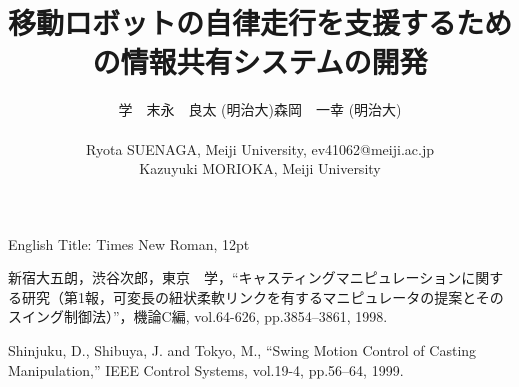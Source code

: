 \documentclass[9pt]{jarticle}
\begin{document}
\makeatletter
\title{移動ロボットの自律走行を支援するための情報共有システムの開発}
{}
{English Title: Times New Roman, 12pt}
{}


\author{
\begin{tabular}{ll}
 \hspace{1zw}学\hspace{1zw}　末永　良太 (明治大)\hspace{1zw}森岡　一幸 (明治大)\\
 &\\
 \multicolumn{2}{l}{\small Ryota SUENAGA, Meiji University, ev41062@meiji.ac.jp}\\
 \multicolumn{2}{l}{\small Kazuyuki MORIOKA, Meiji University}\\
\end{tabular}
}
\makeatother


\date{} %

\maketitle
\thispagestyle{empty}
\pagestyle{empty}

\small

\begin{spacing}{1.2}




\end{spacing}

\footnotesize
\begin{thebibliography}{99}

新宿大五朗，渋谷次郎，東京　学，``キャスティングマニピュレーションに関する研究（第1報，可変長の紐状柔軟リンクを有するマニピュレータの提案とそのスイング制御法）''，機論C編, vol.64-626, pp.3854--3861, 1998.

Shinjuku, D., Shibuya, J. and Tokyo, M., ``Swing Motion Control of Casting Manipulation,'' IEEE Control Systems, vol.19-4, pp.56--64, 1999.

\end{thebibliography}

\normalsize
\end{document}
